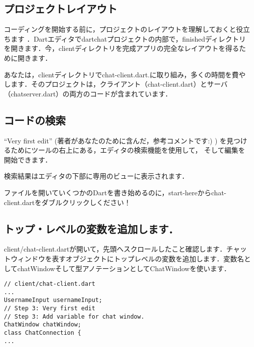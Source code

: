 \subsection{プロジェクトレイアウト}

コーディングを開始する前に，プロジェクトのレイアウトを理解しておくと役立ちます
．Dartエディタでdartchatプロジェクトの内部で，finishedディレクトリを開きます．今，clientディレクトリを完成アプリの完全なレイアウトを得るために開きます．


あなたは，clientディレクトリでchat-client.dart.に取り組み，多くの時間を費やします．そのプロジェクトは，クライアント（chat-client.dart）とサーバ（chatserver.dart）の両方のコードが含まれています．

\subsection{コードの検索}

``Very first edit'' (著者があなたのために含んだ，参考コメントです:) )
を見つけるためにツールの右上にある，エディタの検索機能を使用して，
そして編集を開始できます．


検索結果はエディタの下部に専用のビューに表示されます．


ファイルを開いていくつかのDartを書き始めるのに，start-hereからchat-client.dartをダブルクリックしください！


\subsection{トップ・レベルの変数を追加します．}

client/chat-client.dartが開いて，先頭へスクロールしたこと確認します．チャットウィンドウを表すオブジェクトにトップレベルの変数を追加します．変数名としてchatWindowそして型アノテーションとしてChatWindowを使います．

\begin{verbatim}
// client/chat-client.dart
...
UsernameInput usernameInput;
// Step 3: Very first edit
// Step 3: Add variable for chat window.
ChatWindow chatWindow;
class ChatConnection {
...
\end{verbatim}

